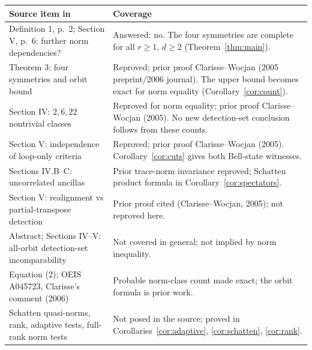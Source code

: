 \documentclass[11pt]{article}
\begin{document}
\begin{center}\small
\begin{tabular}{@{}p{.36\linewidth}p{.57\linewidth}@{}}
\toprule
Source item in \cite{CW} & Coverage\\
\midrule
Definition 1, p.~2; Section V, p.~6: further norm dependencies? &
Answered: no. The four symmetries are complete for all $r\geq1$,
$d\geq2$ (Theorem~\ref{thm:main}).\\[3pt]
Theorem 3: four symmetries and orbit bound &
Reproved; prior proof Clarisse--Wocjan (2005 preprint/2006 journal).
The upper bound becomes exact for norm equality
(Corollary~\ref{cor:count}).\\[3pt]
Section IV: $2,6,22$ nontrivial classes &
Reproved for norm equality; prior proof Clarisse--Wocjan (2005).
No new detection-set conclusion follows from these counts.\\[3pt]
Section V: independence of loop-only criteria &
Reproved; prior proof Clarisse--Wocjan (2005).
Corollary~\ref{cor:cuts} gives both Bell-state witnesses.\\[3pt]
Sections IV.B--C: uncorrelated ancillas &
Prior trace-norm invariance reproved; Schatten product formula
in Corollary~\ref{cor:spectators}.\\[3pt]
Section V: realignment vs partial-transpose detection &
Prior proof cited (Clarisse--Wocjan, 2005); not reproved here.\\[3pt]
Abstract; Sections IV--V: all-orbit detection-set incomparability &
Not covered in general; not implied by norm inequality.\\[3pt]
Equation (2); OEIS A045723, Clarisse's comment (2006) &
Probable norm-class count made exact; the orbit formula is prior work.\\[3pt]
Schatten quasi-norms, rank, adaptive tests, full-rank norm tests &
Not posed in the source; proved in
Corollaries~\ref{cor:adaptive}, \ref{cor:schatten}, \ref{cor:rank}.\\
\bottomrule
\end{tabular}
\end{center}
\end{document}
